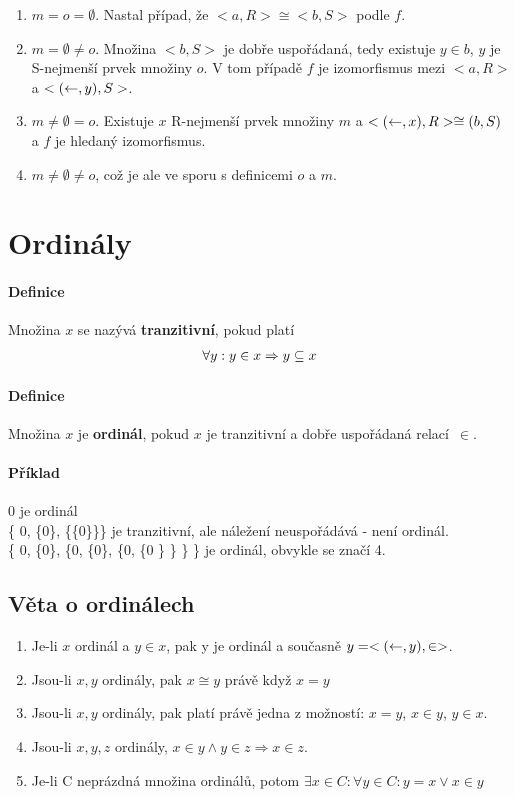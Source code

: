 \documentclass[a4paper,12pt,titlepage]{article}
\begin{document}
\begin{enumerate}
\begin{enumerate}
	\item $m = o = \emptyset$.  Nastal případ, že $<a, R> \cong <b,S>$ podle $f$.
	\item $m = \emptyset \neq o$. Množina $<b,S>$ je dobře uspořádaná, tedy
	existuje $y \in b$, $y$ je S-nejmenší prvek množiny $o$. V tom případě $f$ je
	izomorfismus mezi $<a,R>$ a $<(\leftarrow, y), S>$.
	\item $m \neq \emptyset = o$. Existuje $x$ R-nejmenší prvek množiny $m$ a
	$<(\leftarrow, x), R> \cong (b,S)$ a $f$ je hledaný izomorfismus.
	\item $m \neq \emptyset \neq o$, což je ale ve sporu s definicemi $o$ a $m$.
\end{enumerate}
\end{enumerate}


\section{Ordinály}
\setcounter{equation}{0}
\paragraph{Definice}
Množina $x$ se nazývá \textbf{tranzitivní}, pokud platí 
\begin{align}
	\forall y: y \in x \Rightarrow y \subseteq x
\end{align}
\paragraph{Definice}
Množina $x$ je \textbf{ordinál}, pokud $x$ je tranzitivní a dobře uspořádaná
relací~$\in$.
\paragraph{Příklad}
0  je ordinál \\
\{ 0, \{0\}, \{\{0\}\}\} je tranzitivní, ale náležení neuspořádává - není
ordinál. \\
\{ 0, \{0\}, \{0, \{0\}, \{0, \{0 \} \} \} \} je ordinál, obvykle se značí 4.

\subsection{Věta o ordinálech}
\setcounter{equation}{0}
\begin{enumerate}
	\item Je-li $x$ ordinál a $y \in x$, pak y je ordinál a současně $y = <( \leftarrow, y), \in>$.
	\item Jsou-li $x, y$ ordinály, pak $x \cong y$ právě když $x = y$
	\item Jsou-li $x, y$ ordinály, pak platí právě jedna z možností: $x = y$, $x
	\in y$, $y \in x$.
	\item Jsou-li $x,y, z$ ordinály, $x \in y \land y \in z \Rightarrow x \in z$.
	\item Je-li C neprázdná množina ordinálů, potom $\exists x \in C: \forall y
	\in C: y = x \lor x \in y$
\end{enumerate}
\end{document}
